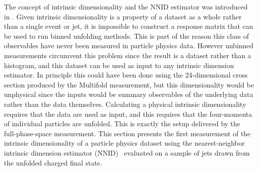 The concept of intrinsic dimensionality and the NNID estimator was introduced in .
Given intrinsic dimensionality is a property of a dataset as a whole rather than a single event or jet, it is impossible to construct a response matrix that can be used to run binned unfolding methods.
This is part of the reason this class of observables have never been measured in particle physics data.
However unbinned measurements circumvent this problem since the result is a dataset rather than a histogram, and this dataset can be used as input to any intrinsic dimension estimator.
In principle this could have been done using the 24-dimensional cross section produced by the Multifold measurement, but this dimensionality would be unphysical since the inputs would be summary observables of the underlying data rather than the data themselves.
Calculating a physical intrinsic dimensionality requires that the data are used as input, and this requires that the four-momenta of individual particles are unfolded.
This is exactly the setup delivered by the full-phase-space measurement.
This section presents the first measurement of the intrinsic dimensionality of a particle physics dataset using the nearest-neighbor intrinsic dimension estimator (NNID)~\cite{NIPS2004_74934548} evaluated on a sample of jets drawn from the unfolded charged final state.


